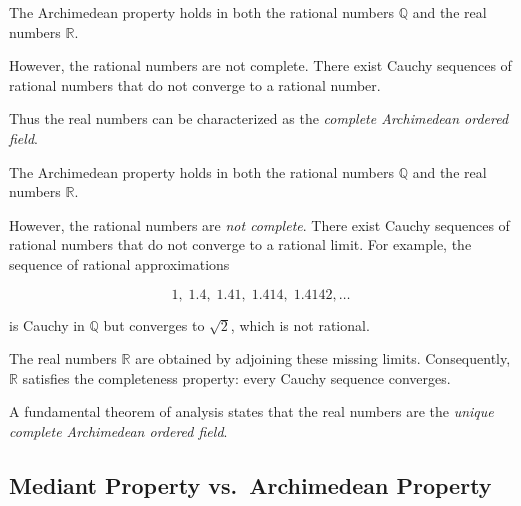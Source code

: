 \begin{remark}

The Archimedean property holds in both the rational numbers
$\mathbb{Q}$ and the real numbers $\mathbb{R}$.

However, the rational numbers are not complete.  There exist
Cauchy sequences of rational numbers that do not converge to a
rational number.

Thus the real numbers can be characterized as the
\emph{complete Archimedean ordered field}.

\end{remark}



\begin{remark}

The Archimedean property holds in both the rational numbers
$\mathbb{Q}$ and the real numbers $\mathbb{R}$.

However, the rational numbers are \emph{not complete}.  There exist
Cauchy sequences of rational numbers that do not converge to a
rational limit.  For example, the sequence of rational approximations

\[
1,\;1.4,\;1.41,\;1.414,\;1.4142,\dots
\]

is Cauchy in $\mathbb{Q}$ but converges to $\sqrt{2}$, which is not
rational.

The real numbers $\mathbb{R}$ are obtained by adjoining these missing
limits.  Consequently, $\mathbb{R}$ satisfies the completeness
property: every Cauchy sequence converges.

A fundamental theorem of analysis states that the real numbers are
the \emph{unique complete Archimedean ordered field}.

\end{remark}




\subsection{Mediant Property vs.\ Archimedean Property}



